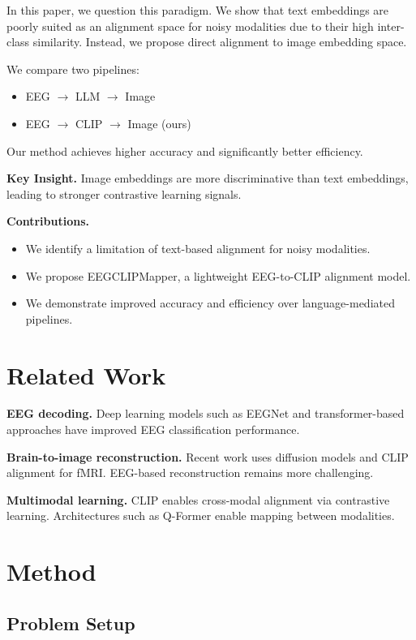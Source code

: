 In this paper, we question this paradigm. We show that text embeddings are poorly suited as an alignment space for noisy modalities due to their high inter-class similarity. Instead, we propose direct alignment to image embedding space.

We compare two pipelines:
\begin{itemize}
\item EEG $\rightarrow$ LLM $\rightarrow$ Image
\item EEG $\rightarrow$ CLIP $\rightarrow$ Image (ours)
\end{itemize}

Our method achieves higher accuracy and significantly better efficiency.

\textbf{Key Insight.} Image embeddings are more discriminative than text embeddings, leading to stronger contrastive learning signals.

\textbf{Contributions.}
\begin{itemize}
\item We identify a limitation of text-based alignment for noisy modalities.
\item We propose EEGCLIPMapper, a lightweight EEG-to-CLIP alignment model.
\item We demonstrate improved accuracy and efficiency over language-mediated pipelines.
\end{itemize}

\section{Related Work}

\textbf{EEG decoding.}
Deep learning models such as EEGNet and transformer-based approaches have improved EEG classification performance.

\textbf{Brain-to-image reconstruction.}
Recent work uses diffusion models and CLIP alignment for fMRI. EEG-based reconstruction remains more challenging.

\textbf{Multimodal learning.}
CLIP enables cross-modal alignment via contrastive learning. Architectures such as Q-Former enable mapping between modalities.

\section{Method}

\subsection{Problem Setup}

